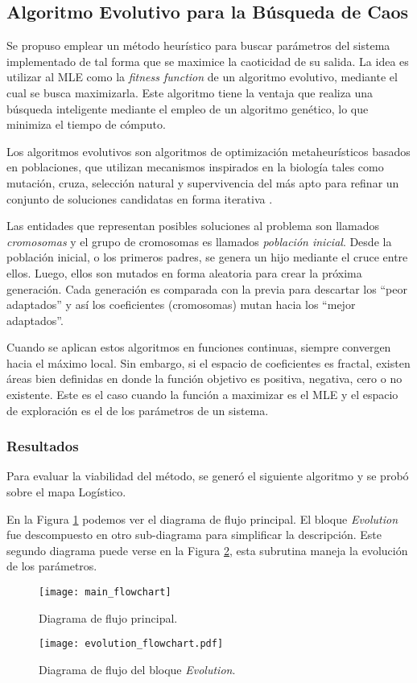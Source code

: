 \subsection{Algoritmo Evolutivo para la Búsqueda de Caos}

Se propuso emplear un método heurístico para buscar parámetros del sistema implementado de tal forma que se maximice la caoticidad de su salida.
La idea es utilizar al MLE como la \textit{fitness function} de un algoritmo evolutivo, mediante el cual se busca maximizarla.
Este algoritmo tiene la ventaja que realiza una búsqueda inteligente mediante el empleo de un algoritmo genético, lo que minimiza el tiempo de cómputo.

Los algoritmos evolutivos son algoritmos de optimización metaheurísticos basados en poblaciones, que utilizan mecanismos inspirados en la biología tales como mutación, cruza, selección natural y supervivencia del más apto para refinar un conjunto de soluciones candidatas en forma iterativa \cite{Weise2009}.

Las entidades que representan posibles soluciones al problema son llamados \textit{cromosomas} y el grupo de cromosomas es llamados \textit{población inicial}.
Desde la población inicial, o los primeros padres, se genera un hijo mediante el cruce entre ellos.
Luego, ellos son mutados en forma aleatoria para crear la próxima generación.
Cada generación es comparada con la previa para descartar los ``peor adaptados'' y así los coeficientes (cromosomas) mutan hacia los ``mejor adaptados''.

Cuando se aplican estos algoritmos en funciones continuas, siempre convergen hacia el máximo local.
Sin embargo, si el espacio de coeficientes es fractal, existen áreas bien definidas en donde la función objetivo es positiva, negativa, cero o no existente.
Este es el caso cuando la función a maximizar es el MLE y el espacio de exploración es el de los parámetros de un sistema.

\subsubsection{Resultados}

Para evaluar la viabilidad del método, se generó el siguiente algoritmo y se probó sobre el mapa Logístico.

En la Figura \ref{fig:diagramaflujo1} podemos ver el diagrama de flujo principal.
El bloque \textit{Evolution} fue descompuesto en otro sub-diagrama para simplificar la descripción.
Este segundo diagrama puede verse en la Figura \ref{fig:diagramaflujo2}, esta subrutina maneja la evolución de los parámetros.
%
\begin{figure}
	\centering
	\texttt{[image: main\_flowchart]}\\
	\caption{Diagrama de flujo principal.}
	\label{fig:diagramaflujo1}
\end{figure}
%
\begin{figure}
	\centering
	\texttt{[image: evolution\_flowchart.pdf]}\\
	\caption{Diagrama de flujo del bloque \textit{Evolution}.}\label{fig:diagramaflujo2}
\end{figure}

